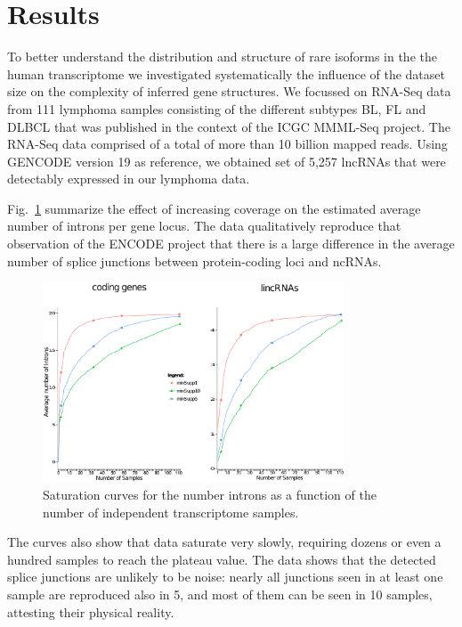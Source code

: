 \documentclass[ncrna,article,submit,moreauthors,pdftex,10pt,a4paper]{mdpi}
\begin{document}
\section{Results}

To better understand the distribution and structure of rare isoforms in the
the human transcriptome we investigated systematically the influence of the
dataset size on the complexity of inferred gene structures. We focussed on
RNA-Seq data from 111 lymphoma samples consisting of the different subtypes BL, FL and DLBCL that was published in the context of the ICGC MMML-Seq project\cite{Richter:12a}. The RNA-Seq data comprised of a total of more than 10 billion mapped reads. Using GENCODE version 19 as reference, we obtained set of 5,257 lncRNAs that were detectably expressed in our lymphoma data.

Fig.~\ref{fig:saturation} summarize the effect of increasing coverage on
the estimated average number of introns per gene locus. The data
qualitatively reproduce that observation of the ENCODE project that there is
a large difference in the average number of splice junctions between
protein-coding loci and ncRNAs. 

\begin{figure}[t]
\begin{center}
  \includegraphics[width=0.8\textwidth]{saturation}
\end{center}
\caption{Saturation curves for the number introns as a function of the 
    number of independent transcriptome samples.}
  \label{fig:saturation} 
\end{figure}

The curves also show that data saturate very slowly, requiring dozens or
even a hundred samples to reach the plateau value. The data shows that the
detected splice junctions are unlikely to be noise: nearly all junctions
seen in at least one sample are reproduced also in 5, and most of them can
be seen in 10 samples, attesting their physical reality. 
\end{document}
